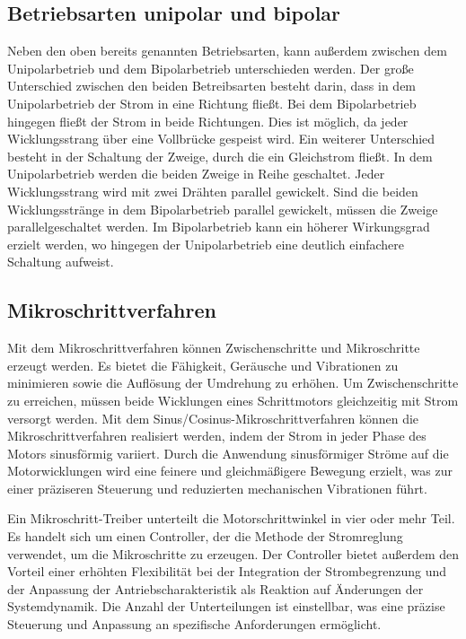\subsection{Betriebsarten unipolar und bipolar}

Neben den oben bereits genannten Betriebsarten, kann außerdem zwischen dem Unipolarbetrieb und dem Bipolarbetrieb unterschieden werden. Der große Unterschied zwischen den beiden Betreibsarten besteht darin, dass in dem Unipolarbetrieb der Strom in eine Richtung fließt. Bei dem Bipolarbetrieb hingegen fließt der Strom in beide Richtungen. Dies ist möglich, da jeder Wicklungsstrang über eine Vollbrücke gespeist wird. Ein weiterer Unterschied besteht in der Schaltung der Zweige, durch die ein Gleichstrom fließt. In dem Unipolarbetrieb werden die beiden Zweige in Reihe geschaltet. Jeder Wicklungsstrang wird mit zwei Drähten parallel gewickelt. Sind die beiden Wicklungsstränge in dem Bipolarbetrieb parallel gewickelt, müssen die Zweige parallelgeschaltet werden. Im Bipolarbetrieb kann ein höherer Wirkungsgrad erzielt werden, wo hingegen der Unipolarbetrieb eine deutlich einfachere Schaltung aufweist. \cite{Schroder.2021}

\subsection{Mikroschrittverfahren}

Mit dem Mikroschrittverfahren können Zwischenschritte und Mikroschritte erzeugt werden. Es bietet die Fähigkeit, Geräusche und Vibrationen zu minimieren sowie die Auflösung der Umdrehung zu erhöhen. Um Zwischenschritte zu erreichen, müssen beide Wicklungen eines Schrittmotors gleichzeitig mit Strom versorgt werden. 
Mit dem Sinus/Cosinus-Mikroschrittverfahren können die Mikroschrittverfahren realisiert werden, indem der Strom in jeder Phase des Motors sinusförmig variiert. Durch die Anwendung sinusförmiger Ströme auf die Motorwicklungen wird eine feinere und gleichmäßigere Bewegung erzielt, was zur einer präziseren Steuerung und reduzierten mechanischen Vibrationen führt.\cite{MarcMcComb.2024}
  
Ein Mikroschritt-Treiber unterteilt die Motorschrittwinkel in vier oder mehr Teil. Es handelt sich um einen Controller, der die Methode der Stromreglung verwendet, um die Mikroschritte zu erzeugen. Der Controller bietet außerdem den Vorteil einer erhöhten Flexibilität bei der Integration der Strombegrenzung und der Anpassung der Antriebscharakteristik als Reaktion auf Änderungen der Systemdynamik. Die Anzahl der Unterteilungen ist einstellbar, was eine präzise Steuerung und Anpassung an spezifische Anforderungen ermöglicht.\cite{Babiel.2023}

